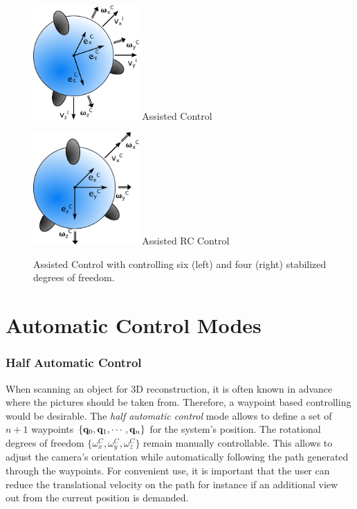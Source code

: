 \begin{figure}[H]		
	\small{
		\begin{center}
			\parbox{0.36\textwidth}{\centering \includegraphics[width=0.36\textwidth]{AC}
			 Assisted Control}
			\hspace{0.1\textwidth}			
			\parbox{0.36\textwidth}{\centering \includegraphics[width=0.36\textwidth]{RC}
			Assisted RC Control}
	\caption[Assisted Control]{Assisted Control with controlling six (left) and four (right) stabilized degrees of freedom.}
		\label{fig:assisted_control}
		\end{center}
	}			
	\vspace{4.5mm}
\end{figure}

\section{Automatic Control Modes}
\label{sec:automaticControlModes}

\subsubsection{Half Automatic Control}
When scanning an object for 3D reconstruction, it is often known in advance where the pictures should be taken from. Therefore, a waypoint based controlling would be desirable. The \textit{half automatic control} mode allows to define a set of $n+1$ waypoints $\{{\bf q}_0, {\bf q}_1, \cdots, {\bf q}_n\}$ for the system's position. The rotational degrees of freedom $\{\omega_x^C, \omega_y^C, \omega_z^C\}$ remain manually controllable. This allows to adjust the camera's orientation while automatically following the path generated through the waypoints. For convenient use, it is important that the user can reduce the translational velocity on the path for instance if an additional view out from the current position is demanded.

